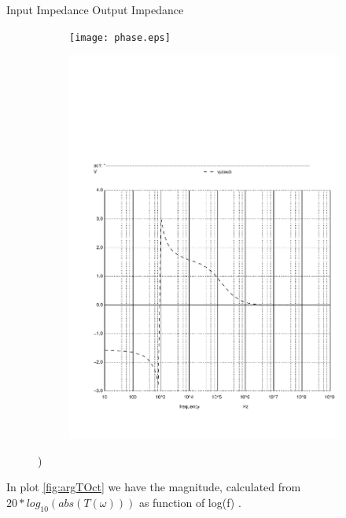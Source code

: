 Input Impedance Output Impedance

\begin{figure}[h]
  \centering
  \begin{subfigure}{0.5\textwidth}
    \texttt{[image: phase.eps]}
    \label{fig:output1}
  \end{subfigure}
  \begin{subfigure}{0.4\textwidth}
    \includegraphics[width=\linewidth, clip]{phase.pdf}
    \label{fig:output2}
  \end{subfigure}
  \caption{\small  )}
  \label{output_deviation}
\end{figure}


In plot \ref{fig:argTOct} we have the magnitude, calculated from $20*log_{10}(abs(T(\omega)))$ as function of log(f) .

